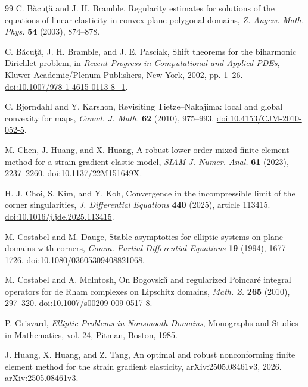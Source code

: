 \documentclass[11pt,a4paper]{article}
\theoremstyle{remark}
\numberwithin{equation}{section}
\begin{document}
\begin{thebibliography}{99}
C. B\u{a}cu\c{t}\u{a} and J. H. Bramble,
Regularity estimates for solutions of the equations of linear elasticity
in convex plane polygonal domains,
\emph{Z. Angew. Math. Phys.} \textbf{54} (2003), 874--878.

C. B\u{a}cu\c{t}\u{a}, J. H. Bramble, and J. E. Pasciak,
Shift theorems for the biharmonic Dirichlet problem,
in \emph{Recent Progress in Computational and Applied PDEs},
Kluwer Academic/Plenum Publishers, New York, 2002, pp. 1--26.
\href{https://doi.org/10.1007/978-1-4615-0113-8_1}{doi:10.1007/978-1-4615-0113-8\_1}.

C. Bjorndahl and Y. Karshon,
Revisiting Tietze--Nakajima: local and global convexity for maps,
\emph{Canad. J. Math.} \textbf{62} (2010), 975--993.
\href{https://doi.org/10.4153/CJM-2010-052-5}{doi:10.4153/CJM-2010-052-5}.

M. Chen, J. Huang, and X. Huang,
A robust lower-order mixed finite element method for a strain gradient
elastic model,
\emph{SIAM J. Numer. Anal.} \textbf{61} (2023), 2237--2260.
\href{https://doi.org/10.1137/22M151649X}{doi:10.1137/22M151649X}.

H. J. Choi, S. Kim, and Y. Koh,
Convergence in the incompressible limit of the corner singularities,
\emph{J. Differential Equations} \textbf{440} (2025), article 113415.
\href{https://doi.org/10.1016/j.jde.2025.113415}{doi:10.1016/j.jde.2025.113415}.

M. Costabel and M. Dauge,
Stable asymptotics for elliptic systems on plane domains with corners,
\emph{Comm. Partial Differential Equations} \textbf{19} (1994), 1677--1726.
\href{https://doi.org/10.1080/03605309408821068}{doi:10.1080/03605309408821068}.

M. Costabel and A. McIntosh,
On Bogovski\u{\i} and regularized Poincar\'e integral operators for
de Rham complexes on Lipschitz domains,
\emph{Math. Z.} \textbf{265} (2010), 297--320.
\href{https://doi.org/10.1007/s00209-009-0517-8}{doi:10.1007/s00209-009-0517-8}.

P. Grisvard, \emph{Elliptic Problems in Nonsmooth Domains},
Monographs and Studies in Mathematics, vol. 24, Pitman, Boston, 1985.

J. Huang, X. Huang, and Z. Tang,
An optimal and robust nonconforming finite element method for the
strain gradient elasticity,
arXiv:2505.08461v3, 2026.
\href{https://arxiv.org/abs/2505.08461v3}{arXiv:2505.08461v3}.


\end{thebibliography}
\end{document}
